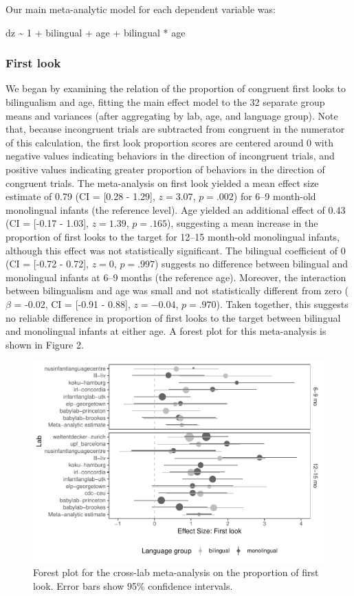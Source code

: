 \documentclass[
  english,
  ,man,floatsintext]{apa6}
\begin{document}
Our main meta-analytic model for each dependent variable was:

dz \textasciitilde{} 1 + bilingual + age + bilingual * age

\hypertarget{first-look-1}{%
\subsubsection{First look}\label{first-look-1}}

We began by examining the relation of the proportion of congruent first looks to bilingualism and age, fitting the main effect model to the 32 separate group means and variances (after aggregating by lab, age, and language group). Note that, because incongruent trials are subtracted from congruent in the numerator of this calculation, the first look proportion scores are centered around 0 with negative values indicating behaviors in the direction of incongruent trials, and positive values indicating greater proportion of behaviors in the direction of congruent trials. The meta-analysis on first look yielded a mean effect size estimate of 0.79 (CI = {[}0.28 - 1.29{]}, \(z = 3.07\), \(p = .002\)) for 6--9 month-old monolingual infants (the reference level). Age yielded an additional effect of 0.43 (CI = {[}-0.17 - 1.03{]}, \(z = 1.39\), \(p = .165\)), suggesting a mean increase in the proportion of first looks to the target for 12--15 month-old monolingual infants, although this effect was not statistically significant. The bilingual coefficient of 0 (CI = {[}-0.72 - 0.72{]}, \(z = 0\), \(p = .997\)) suggests no difference between bilingual and monolingual infants at 6--9 months (the reference age). Moreover, the interaction between bilingualism and age was small and not statistically different from zero (\(\beta\) = -0.02, CI = {[}-0.91 - 0.88{]}, \(z = -0.04\), \(p = .970\)). Taken together, this suggests no reliable difference in proportion of first looks to the target between bilingual and monolingual infants at either age. A forest plot for this meta-analysis is shown in Figure 2.

\begin{figure}
\centering
\includegraphics{gaze-following-paper_files/figure-latex/fig2-1.pdf}
\caption{\label{fig:fig2}Forest plot for the cross-lab meta-analysis on the proportion of first look. Error bars show 95\% confidence intervals.}
\end{figure}
\end{document}
